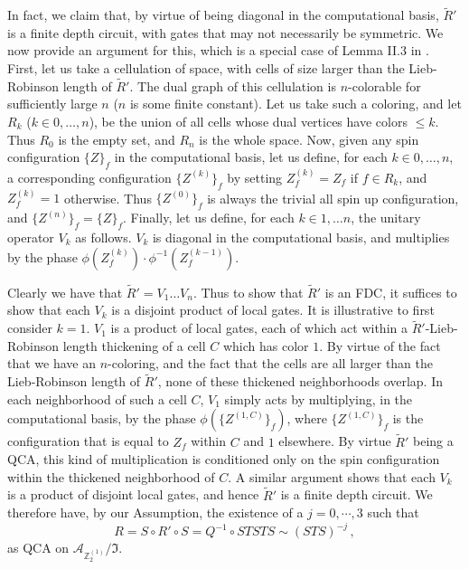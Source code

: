 \documentclass[aps,twocolumn,prx,floatfix,preprintnumbers, nofootinbib,10pt]{revtex4-2}
\numberwithin{equation}{section}
\theoremstyle{definition}
\theoremstyle{remark}
\theoremstyle{claim}
\newcommand{\be}{\begin{equation}}
\newcommand{\ee}{\end{equation}}
\newcommand{\Z}{{\mathbb Z}}
\newcommand{\mc}[1]{\mathcal{#1}}
\begin{document}
In fact, we claim that, by virtue of being diagonal in the computational basis, $\tilde{R}'$ is a finite depth circuit, with gates that may not necessarily be symmetric.  We now provide an argument for this, which is a special case of Lemma II.3 in  \cite{Fidkowski:2019nju}.  First, let us take a cellulation of space, with cells of size larger than the Lieb-Robinson length of $\tilde{R}'$.  The dual graph of this cellulation is $n$-colorable for sufficiently large $n$ ($n$ is some finite constant).  Let us take such a coloring, and let $R_k$ ($k \in 0, \ldots, n$), be the union of all cells whose dual vertices have colors $\leq k$.  Thus $R_0$ is the empty set, and $R_n$ is the whole space.  Now, given any spin configuration $\{Z\}_f$ in the computational basis, let us define, for each $k \in 0, \ldots, n$, a corresponding configuration $\{Z^{(k)}\}_f$ by setting $Z^{(k)}_f = Z_f$ if $f \in R_k$, and $Z^{(k)}_f = 1$ otherwise.  Thus $\{Z^{(0)}\}_f$ is always the trivial all spin up configuration, and $\{Z^{(n)}\}_f = \{Z\}_f$.  Finally, let us define, for each $k \in 1, \ldots n$, the unitary operator $V_k$ as follows.  $V_k$ is diagonal in the computational basis, and multiplies by the phase $\phi(Z^{(k)}_f)\cdot \phi^{-1}(Z^{(k-1)}_f)$.

Clearly we have that $\tilde{R}' = V_1 \ldots V_n$.  Thus to show that $\tilde{R}'$ is an FDC, it suffices to show that each $V_k$ is a disjoint product of local gates.  It is illustrative to first consider $k=1$.  $V_1$ is a product of local gates, each of which act within a  $\tilde{R}'$-Lieb-Robinson length thickening of a cell $C$ which has color $1$.  By virtue of the fact that we have an $n$-coloring, and the fact that the cells are all larger than the Lieb-Robinson length of $\tilde{R}'$, none of these thickened neighborhoods overlap.  In each neighborhood of such a cell $C$, $V_1$ simply acts by multiplying, in the computational basis, by the phase $\phi(\{Z^{(1,C)}\}_f)$, where $\{Z^{(1,C)}\}_f$ is the configuration that is equal to $Z_f$ within $C$ and $1$ elsewhere.  By virtue $\tilde{R}'$ being a QCA, this kind of multiplication is conditioned only on the spin configuration within the thickened neighborhood of $C$.
A similar argument shows that each $V_k$ is a product of disjoint local gates, and hence $\tilde{R}'$ is a finite depth circuit.  We therefore have, by our Assumption, the existence of a $j=0, \cdots, 3$ such that 
\be
R = S \circ R' \circ S = Q^{-1} \circ STSTS \sim (STS)^{-j} \,,
\ee
as QCA on $\mc{A}_{\Z_2^{(1)}} / \mathfrak{I}$.
\end{document}
